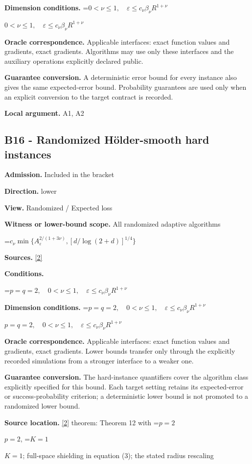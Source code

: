 \documentclass[10pt,a4paper]{article}
\newcommand{\AtlasMath}[1]{\par\begingroup\centering\setbox0=\hbox{$\displaystyle #1$}\ifdim\wd0>1.4\linewidth\typeout{ATLAS WIDE FORMULA: \the\wd0}\fi\ifdim\wd0>\linewidth\resizebox{\linewidth}{!}{\box0}\else\box0\fi\par\endgroup}
\newcommand{\AtlasInlineMath}[1]{\begingroup\setbox0=\hbox{$#1$}\ifdim\wd0>.4\linewidth\endgroup\AtlasMath{#1}\else\endgroup$#1$\fi}
\begin{document}
\textbf{Dimension conditions.} \AtlasInlineMath{0<\nu\le1,\quad\varepsilon\le c_\nu\beta_\nu R^{1+\nu}}

\textbf{Oracle correspondence.} Applicable interfaces: exact function values and gradients, exact gradients. Algorithms may use only these interfaces and the auxiliary operations explicitly declared public.

\textbf{Guarantee conversion.} A deterministic error bound for every instance also gives the same expected-error bound. Probability guarantees are used only when an explicit conversion to the target contract is recorded.

\textbf{Local argument.} A1, A2

\subsection{B16 - Randomized Hölder-smooth hard instances}
\textbf{Admission.} Included in the bracket

\textbf{Direction.} lower

\textbf{View.} Randomized / Expected loss

\textbf{Witness or lower-bound scope.} All randomized adaptive algorithms

\AtlasMath{c_\nu\min\{A_\varepsilon^{2/(1+3\nu)},[d/\log(2+d)]^{1/4}\}}
\textbf{Sources.} \href{https://proceedings.mlr.press/v99/diakonikolas19c/diakonikolas19c.pdf}{[2]}

\textbf{Conditions.} 
\AtlasMath{p=q=2,\quad0<\nu\le1,\quad\varepsilon\le c_\nu\beta_\nu R^{1+\nu}}


\textbf{Dimension conditions.} \AtlasInlineMath{p=q=2,\quad0<\nu\le1,\quad\varepsilon\le c_\nu\beta_\nu R^{1+\nu}}

\textbf{Oracle correspondence.} Applicable interfaces: exact function values and gradients, exact gradients. Lower bounds transfer only through the explicitly recorded simulations from a stronger interface to a weaker one.

\textbf{Guarantee conversion.} The hard-instance quantifiers cover the algorithm class explicitly specified for this bound. Each target setting retains its expected-error or success-probability criterion; a deterministic lower bound is not promoted to a randomized lower bound.

\textbf{Source location.} \href{https://proceedings.mlr.press/v99/diakonikolas19c/diakonikolas19c.pdf}{[2]} theorem: Theorem 12 with \AtlasInlineMath{p=2}, \AtlasInlineMath{K=1}; full-space shielding in equation (3); the stated radius rescaling
\end{document}
